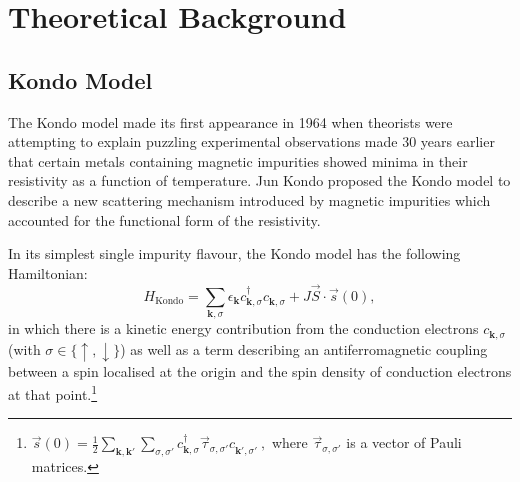 
\section{Theoretical Background} %
\label{sec:theory}


\subsection{Kondo Model}

The Kondo model made its first appearance in 1964 when theorists were attempting to explain puzzling experimental observations made 30 years earlier that certain metals containing magnetic impurities showed minima in their resistivity as a function of temperature. Jun Kondo proposed the Kondo model to describe a new scattering mechanism introduced by magnetic impurities which accounted for the functional form of the resistivity.

In its simplest single impurity flavour, the Kondo model has the following Hamiltonian: \begin{equation} H_{\text{Kondo}}=\sum_{\boldsymbol{k},\sigma}\epsilon_{\boldsymbol{k}} c_{\boldsymbol{k},\sigma}^{\dagger}c^{}_{\boldsymbol{k},\sigma} + J\vec{S}\cdot\vec{s}(0) , \label{eq:KondoHamiltonian}\end{equation} in which there is a kinetic energy contribution from the conduction electrons $ c^{}_{\boldsymbol{k}, \sigma}$ (with $ \sigma \in \{ \uparrow , \downarrow \}$) as well as a term describing an antiferromagnetic coupling between a spin localised at the origin and the spin density of conduction electrons at that point.\footnote{$ \vec{s}(0) = \frac{1}{2} \sum_{\boldsymbol{k}, \boldsymbol{k'}} \sum_{\sigma, \sigma'} c^{\dagger}_{\boldsymbol{k}, \sigma} \vec{\tau}_{\sigma, \sigma'} c^{}_{\boldsymbol{k'}, \sigma'} ~, $ where $ \vec{\tau}_{\sigma, \sigma'} $ is a vector of Pauli matrices.}




